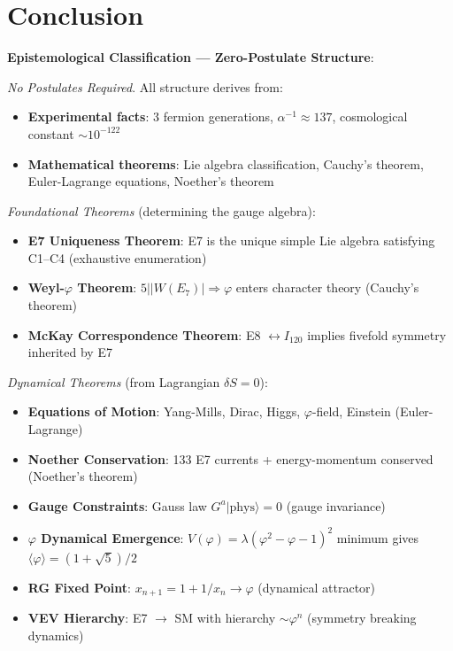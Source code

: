 \documentclass[11pt,a4paper]{article}
\begin{document}
\section{Conclusion}

\textbf{Epistemological Classification --- Zero-Postulate Structure}:

\textit{No Postulates Required}. All structure derives from:
\begin{itemize}
\item \textbf{Experimental facts}: 3 fermion generations, $\alpha^{-1} \approx 137$, cosmological constant $\sim 10^{-122}$
\item \textbf{Mathematical theorems}: Lie algebra classification, Cauchy's theorem, Euler-Lagrange equations, Noether's theorem
\end{itemize}

\textit{Foundational Theorems} (determining the gauge algebra):
\begin{itemize}
\item \textbf{E7 Uniqueness Theorem}: E7 is the unique simple Lie algebra satisfying C1--C4 (exhaustive enumeration)
\item \textbf{Weyl-$\varphi$ Theorem}: $5 | |W(E_7)| \Rightarrow \varphi$ enters character theory (Cauchy's theorem)
\item \textbf{McKay Correspondence Theorem}: E8 $\leftrightarrow I_{120}$ implies fivefold symmetry inherited by E7
\end{itemize}

\textit{Dynamical Theorems} (from Lagrangian $\delta S = 0$):
\begin{itemize}
\item \textbf{Equations of Motion}: Yang-Mills, Dirac, Higgs, $\varphi$-field, Einstein (Euler-Lagrange)
\item \textbf{Noether Conservation}: 133 E7 currents + energy-momentum conserved (Noether's theorem)
\item \textbf{Gauge Constraints}: Gauss law $G^a|\text{phys}\rangle = 0$ (gauge invariance)
\item \textbf{$\varphi$ Dynamical Emergence}: $V(\varphi) = \lambda(\varphi^2 - \varphi - 1)^2$ minimum gives $\langle\varphi\rangle = (1+\sqrt{5})/2$
\item \textbf{RG Fixed Point}: $x_{n+1} = 1 + 1/x_n \to \varphi$ (dynamical attractor)
\item \textbf{VEV Hierarchy}: E7 $\to$ SM with hierarchy $\sim \varphi^n$ (symmetry breaking dynamics)
\end{itemize}
\end{document}

